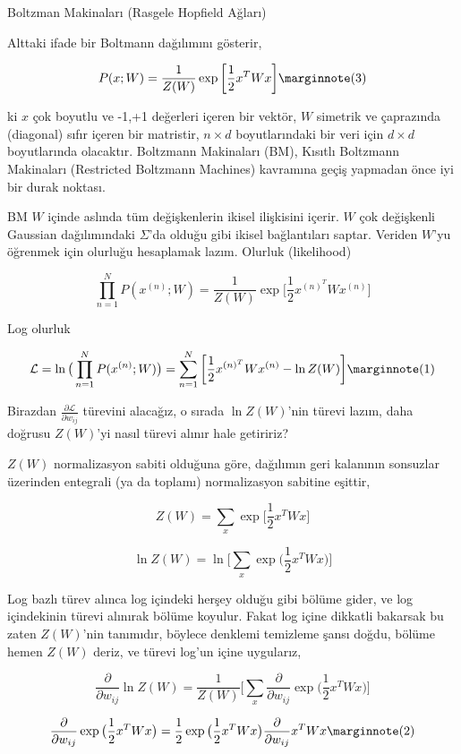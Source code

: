 \documentclass[12pt,fleqn]{article}\usepackage{../../common}
\begin{document}
Boltzman Makinaları (Rasgele Hopfield Ağları) 

Alttaki ifade bir Boltmann dağılımını gösterir, 

$$  
P(x;W) = \frac{1}{Z(W)} 
\exp \bigg[ \frac{1}{2} x^T W x \bigg]
\mlabel{3}
$$

ki $x$ çok boyutlu ve -1,+1 değerleri içeren bir vektör, $W$ simetrik ve
çaprazında (diagonal) sıfır içeren bir matristir, $n \times d$ boyutlarındaki
bir veri için $d \times d$ boyutlarında olacaktır.  Boltzmann Makinaları (BM),
Kısıtlı Boltzmann Makinaları (Restricted Boltzmann Machines) kavramına geçiş
yapmadan önce iyi bir durak noktası.

BM $W$ içinde aslında tüm değişkenlerin ikisel ilişkisini içerir. $W$ çok
değişkenli Gaussian dağılımındaki $\Sigma$'da olduğu gibi ikisel bağlantıları
saptar. Veriden $W$'yu öğrenmek için olurluğu hesaplamak lazım. Olurluk
(likelihood)

$$  
\prod _{n=1}^{N} P(x^{(n)};W) = \frac{1}{Z(W)} 
\exp \bigg[ \frac{1}{2} x^{(n)^T} W x^{(n)} \bigg]
$$

Log olurluk

$$  
\mathcal{L} = \ln \big( \prod _{n=1}^{N} P(x^{(n)};W) \big) = 
\sum _{n=1}^{N} \bigg[ \frac{1}{2} x^{(n)^T} W x^{(n)} - \ln Z(W) \bigg]
\mlabel{1}
$$

Birazdan $\frac{\partial \mathcal L}{\partial w_{ij}}$ türevini alacağız, o
sırada $\ln Z(W)$'nin türevi lazım, daha doğrusu $Z(W)$'yi nasıl türevi alınır
hale getiririz?

$Z(W)$ normalizasyon sabiti olduğuna göre, dağılımın geri kalanının sonsuzlar
üzerinden entegrali (ya da toplamı) normalizasyon sabitine eşittir,

$$ 
Z(W) = \sum_x  \exp \bigg[ \frac{1}{2} x^T W x \bigg]
$$

$$ 
\ln Z(W) = \ln \bigg[ \sum_x  \exp \big( \frac{1}{2} x^T W x \big) \bigg]
$$

Log bazlı türev alınca log içindeki herşey olduğu gibi bölüme gider, ve log
içindekinin türevi alınırak bölüme koyulur. Fakat log içine dikkatli
bakarsak bu zaten $Z(W)$'nin tanımıdır, böylece denklemi temizleme şansı
doğdu, bölüme hemen $Z(W)$ deriz, ve türevi log'un içine uygularız,

$$ 
\frac{\partial}{\partial w_{ij}} \ln Z(W) = 
\frac{1}{Z(W)}
\bigg[ 
\sum_x \frac{\partial}{\partial w_{ij}} \exp \big( \frac{1}{2} x^T W x \big) 
\bigg]
$$

$$ 
\frac{\partial}{\partial w_{ij}} \exp \big( \frac{1}{2} x^T W x \big)  = 
\frac{1}{2}  \exp \big( \frac{1}{2} x^T W x \big) 
\frac{\partial}{\partial w_{ij}}x^T W x
\mlabel{2}
$$
\end{document}
